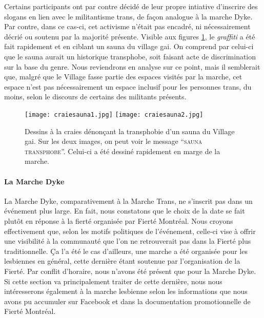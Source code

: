 Certains participants ont par contre décidé de leur propre intiative d'inscrire des slogans en lien avec le militantisme trans, de façon analogue à la marche Dyke.
Par contre, dans ce cas-ci, cet activisme n'était pas encadré, ni nécessairement décrié ou soutenu par la majorité présente.
Visible aux figures \ref{figs:craietrottoir}, le \emph{graffiti} a été fait rapidement et en ciblant un sauna du village gai.
On comprend par celui-ci que le sauna aurait un historique transphobe, soit faisant acte de discrimination sur la base du genre.
Nous reviendrons en analyse sur ce point, mais il semblerait que, malgré que le Village fasse partie des espaces visités par la marche, cet espace n'est pas nécessairement un espace inclusif pour les personnes trans, du moins, selon le discours de certains des militants présents.

\begin{figure}
\centering
{}
{\texttt{[image: craiesauna1.jpg]}}
{\texttt{[image: craiesauna2.jpg]}}
\caption[Dessin à la craie contre la transphobie]{Dessins à la craies dénonçant la transphobie d'un sauna du Village gai. Sur les deux images, on peut voir le message \enquote{\textsc{sauna transphobe}}. Celui-ci a été dessiné rapidement en marge de la marche.}\label{figs:craietrottoir}
\end{figure}

\paragraph{La Marche Dyke}
\label{subsubsec:marchedyke}
La Marche Dyke, comparativement à la Marche Trans, ne s'inscrit pas dans un événement plus large.
En fait, nous constatons que le choix de la date se fait plutôt en réponse à la fierté organisée par Fierté Montréal.
Nous croyons effectivement que, selon les motifs politiques de l'événement, celle-ci vise à offrir une visibilité à la communauté \dyke{} que l'on ne retrouverait pas dans la Fierté plus traditionnelle.
Ça l'a été le cas d'ailleurs, une marche a été organisée pour les lesbiennes en général, cette dernière étant soutenue par l'organisation de la Fierté.
Par conflit d'horaire, nous n'avons été présent que pour la Marche Dyke.
Si cette section va principalement traiter de cette dernière, nous nous intéresserons également à la marche lesbienne selon les informations que nous avons pu accumuler sur Facebook et dans la documentation promotionnelle de Fierté Montréal.

